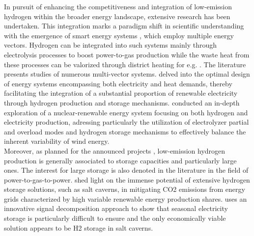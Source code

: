 In pursuit of enhancing the competitiveness and integration of low-emission hydrogen within the broader energy landscape, extensive research has been undertaken. This integration marks a paradigm shift in scientific understanding with the emergence of smart energy systems \citep{lund_smart_2017}, which employ multiple energy vectors.
Hydrogen can be integrated into such systems mainly through electrolysis processes to boost power-to-gas production  while the waste heat from these processes can be valorized through district heating for e.g. \citep{guelpa_towards_2019}.
The literature presents studies of numerous multi-vector systems. \cite{gabrielli_optimal_2018} delved into the optimal design of energy systems encompassing both electricity and heat demands, thereby facilitating the integration of a substantial proportion of renewable electricity through hydrogen production and storage mechanisms.
\cite{haratyk_nuclear-renewables_2012} conducted an in-depth exploration of a nuclear-renewable energy system focusing on both hydrogen and electricity production, adressing particularly the utilization of electrolyzer partial and overload modes and hydrogen storage mechanisms to effectively balance the inherent variability of wind energy.
\\
Moreover, as planned for the announced projects \citep{iea_hydrogen_2023}, low-emission hydrogen production is generally associated to storage capacities and particularly large ones. The interest for large storage is also denoted in the literature in the field of power-to-gas-to-power. \cite{gabrielli_seasonal_2020} shed light on the immense potential of extensive hydrogen storage solutions, such as salt caverns, in mitigating CO2 emissions from energy grids characterized by high variable renewable energy production shares.
\cite{clerjon_matching_2019} uses an innovative signal decomposition approach \citep{CLERJON2022122799} to show that seasonal electricity storage is particularly difficult to ensure and the only economically viable solution appears to be H2 storage in salt caverns.\\

